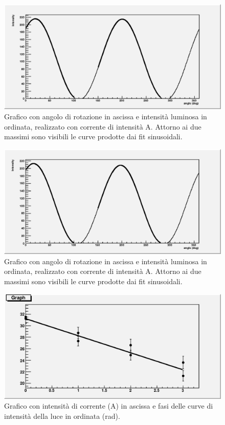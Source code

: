 \documentclass[italian,a4paper]{article}
\begin{document}
\begin{figure}[!h]\centering
\includegraphics[scale=.6]{2polar.eps}
\caption{Grafico con angolo di rotazione in ascissa e intensità luminosa in ordinata, realizzato con corrente di intensità \unit[2]{A}. Attorno ai due massimi sono visibili le curve prodotte dai fit sinusoidali.}\label{2amp}
\end{figure}
\begin{figure}[!h]\centering
\includegraphics[scale=.6]{3polar.eps}
\caption{Grafico con angolo di rotazione in ascissa e intensità luminosa in ordinata, realizzato con corrente di intensità \unit[3]{A}. Attorno ai due massimi sono visibili le curve prodotte dai fit sinusoidali.}\label{3amp}
\end{figure}
\begin{figure}[!h]\centering
\includegraphics[scale=.6]{graph.eps}
\caption{Grafico con intensità di corrente (\unit{A}) in ascissa e fasi delle curve di intensità della luce in ordinata (\unit{rad}).}\label{lin}
\end{figure}
\end{document}
